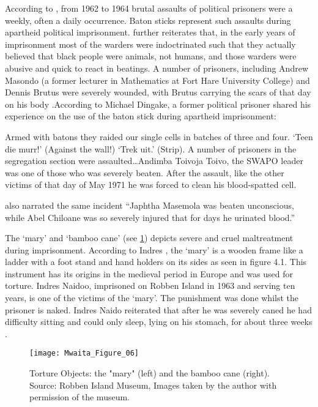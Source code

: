 According to \textcite[131]{Alexander_1994}, from 1962 to 1964 brutal assaults of political prisoners were a weekly, often a daily occurrence. Baton sticks represent such assaults during apartheid political imprisonment. \textcite[131]{Alexander_1994} further reiterates that, in the early years of imprisonment most of the warders were indoctrinated such that they actually believed that black people were animals, not humans, and those warders were abusive and quick to react in beatings. A number of prisoners, including Andrew Masondo (a former lecturer in Mathematics at Fort Hare University College) and Dennis Brutus were severely wounded, with Brutus carrying the scars of that day on his body \textcite[132]{Alexander_1994}.According to \textcite[52]{Hutton_1997} Michael Dingake, a former political prisoner shared his experience on the use of the baton stick during apartheid imprisonment:
\begin{IJSRAquote}{\cite[52]{Hutton_1997}}
    {Armed with batons they raided our single cells in batches of three and four. ‘Teen die murr!’ (Against the wall!) ‘Trek uit.’ (Strip). A number of prisoners in the segregation section were assaulted…Andimba Toivoja Toivo, the SWAPO leader was one of those who was severely beaten. After the assault, like the other victims of that  day of May 1971 he was forced to clean his blood-spatted cell.}
\end{IJSRAquote}
\textcite[28]{Alexander_1994} also narrated the same incident \enquote{Japhtha Masemola was beaten unconscious, while Abel Chiloane was so severely injured that for days he urinated blood.}

The ‘mary’ and ‘bamboo cane’ (see \cref{fig:Mwaita_Figure_06}) depicts severe and cruel maltreatment during imprisonment. According to Indres \textcite[22]{Naidoo_1982}, the ‘mary’ is a wooden frame like a ladder with a foot stand and hand holders on its sides as seen in figure 4.1. This instrument has its origins in the medieval period in Europe and was used for torture. Indres Naidoo, imprisoned on Robben Island in 1963 and serving ten years, is one of the victims of the ‘mary’. The punishment was done whilst the prisoner is naked. Indres Naido reiterated that after he was severely caned he had difficulty sitting and could only sleep, lying on his stomach, for about three weeks \parencite{Naidoo_1982}.

\begin{figure}[!tb]
	\texttt{[image: Mwaita\_Figure\_06]}
	\caption{Torture Objects: the "mary" (left) and the bamboo cane (right).
  {\normalfont\scriptsize \\   Source: Robben Island Museum, Images taken by the author with permission of the museum.
                    }}
	\label{fig:Mwaita_Figure_06}
\end{figure}

